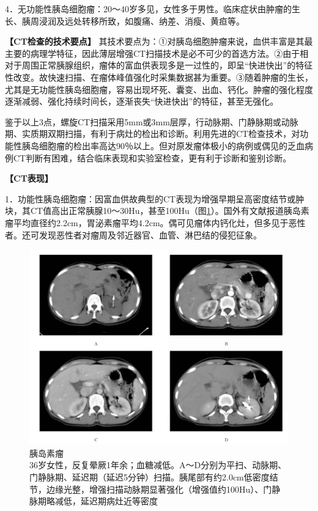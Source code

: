 4．无功能性胰岛细胞瘤：20～40岁多见，女性多于男性。临床症状由肿瘤的生长、胰周浸润及远处转移所致，如腹痛、纳差、消瘦、黄疸等。

\textbf{【CT检查的技术要点】}
其技术要点为：①对胰岛细胞肿瘤来说，血供丰富是其最主要的病理学特征，因此薄层增强CT扫描技术是必不可少的首选方法。②由于相对于周围正常胰腺组织，瘤体的富血供表现多是一过性的，即呈“快进快出”的特征性改变。故快速扫描、在瘤体峰值强化时采集数据甚为重要。③随着肿瘤的生长，尤其是无功能性胰岛细胞瘤，容易出现坏死、囊变、出血、钙化。肿瘤的强化程度逐渐减弱、强化持续时间长，逐渐丧失“快进快出”的特征，甚至无强化。

鉴于以上3点，螺旋CT扫描采用5mm或3mm层厚，行动脉期、门静脉期或动脉期、实质期双期扫描，有利于病灶的检出和诊断。利用先进的CT检查技术，对功能性胰岛细胞瘤的检出率高达90％以上。但对原发瘤体极小的病例或偶见的乏血病例CT判断有困难，结合临床表现和实验室检查，更有利于诊断和鉴别诊断。

\textbf{【CT表现】}

1．功能性胰岛细胞瘤：因富血供故典型的CT表现为增强早期呈高密度结节或肿块，其CT值高出正常胰腺10～30Hu，甚至100Hu（图\ref{fig13-6}）。国外有文献报道胰岛素瘤平均直径约2.2cm，胃泌素瘤平均4.2cm。偶可见瘤体内钙化灶，但多见于恶性者。还可发现恶性者对瘤周及邻近器官、血管、淋巴结的侵犯征象。

\begin{figure}[!htbp]
 \centering
 \includegraphics[width=.7\textwidth,height=\textheight,keepaspectratio]{./images/Image00307.jpg}
 \captionsetup{justification=centering}
 \caption{胰岛素瘤\\{\small 36岁女性，反复晕厥1年余；血糖减低。A～D分别为平扫、动脉期、门静脉期、延迟期（延迟5分钟）扫描。胰尾部有约2.0cm低密度结节，边缘光整，增强扫描动脉期显著强化（增强值约100Hu）、门静脉期略减低，延迟期病灶近等密度}}
 \label{fig13-6}
  \end{figure} 


